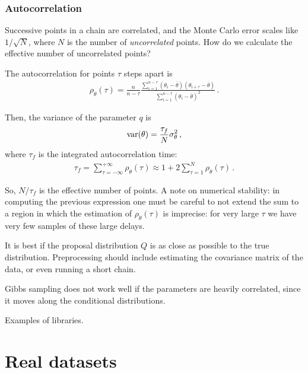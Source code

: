 \documentclass[main.tex]{subfiles}
\begin{document}
\subsection{Autocorrelation}


Successive points in a chain are correlated, and the Monte Carlo error scales like \(1/\sqrt{N}\), where \(N\) is the number of \emph{uncorrelated} points. 
How do we calculate the effective number of uncorrelated points? 

The autocorrelation for points \(\tau \) steps apart is 
%
\begin{align}
\rho_\theta (\tau ) = \frac{n}{n - \tau } \frac{\sum _{i=1}^{n-\tau } (\theta _i - \overline{\theta}) (\theta _{i+\tau } - \overline{\theta})}{\sum _{i=1}^{n-\tau } (\theta _i - \overline{\theta})^2}
\,.
\end{align}

Then, the variance of the parameter \(q\) is 
%
\begin{align}
\text{var} \qty(\theta ) = \frac{\tau _f}{N} \sigma_\theta^2
\,,
\end{align}
%
where \(\tau _f\) is the integrated autocorrelation time: 
%
\begin{align}
\tau _f = \sum _{\tau =- \infty }^{+ \infty } \rho _\theta (\tau )
\approx 1 + 2 \sum _{\tau = 1}^{N} \rho _\theta (\tau )
\,.
\end{align}

So, \(N / \tau _f\) is the effective number of points. 
A note on numerical stability: in computing the previous expression one must be careful to not extend the sum to a region in which the estimation of \(\rho _\theta (\tau )\) is imprecise: for very large \(\tau \) we have very few samples of these large delays.  

It is best if the proposal distribution \(Q\) is as close as possible to the true distribution. 
Preprocessing should include estimating the covariance matrix of the data, or even running a short chain.

Gibbs sampling does not work well if the parameters are heavily correlated, since it moves along the conditional distributions. 

Examples of libraries.

\chapter{Real datasets}
\end{document}
